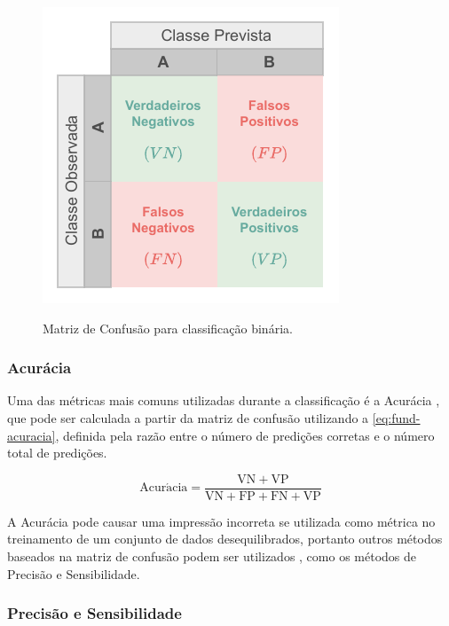 \begin{figure}[h!] %
  \centering
  \caption{Matriz de Confusão para classificação binária.}
  \includegraphics[scale=1.1]{img/img-fundamentacao-matriz.pdf}
  \label{fig:fund-matriz}
\end{figure}

\subsubsection{Acurácia} \label{cap:fund-ia-metricas-acuracia}
Uma das métricas mais comuns utilizadas durante a classificação é a Acurácia \cite{ref:Batarseh-Yang}, que pode ser calculada a partir da matriz de confusão utilizando a \autoref{eq:fund-acuracia}, definida pela razão entre o número de predições corretas e o número total de predições.

\begin{equation} \label{eq:fund-acuracia}
\mathrm{
  Acur\acute{a}cia = \frac{VN + VP}{VN + FP + FN + VP}
}
\end{equation}

A Acurácia pode causar uma impressão incorreta se utilizada como métrica no treinamento de um conjunto de dados desequilibrados, portanto outros métodos baseados na matriz de confusão podem ser utilizados \cite{ref:Batarseh-Yang}, como os métodos de Precisão e Sensibilidade.

\subsubsection{Precisão e Sensibilidade} \label{cap:fund-ia-metricas-pr}

